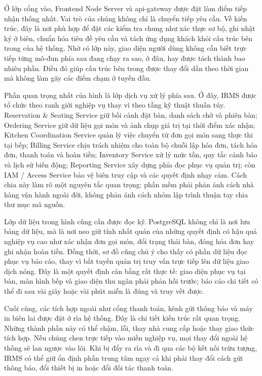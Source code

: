 \documentclass[11pt,a4paper]{article}
\begin{document}
Ở lớp cổng vào, \textsf{Frontend Node Server} và \textsf{api-gateway} được đặt làm điểm tiếp nhận thống nhất. Vai trò của chúng không chỉ là chuyển tiếp yêu cầu. Về kiến trúc, đây là nơi phù hợp để đặt các kiểm tra chung như xác thực sơ bộ, ghi nhật ký ở biên, chuẩn hóa tiêu đề yêu cầu và tách ứng dụng khách khỏi cấu trúc bên trong của hệ thống. Nhờ có lớp này, giao diện người dùng không cần biết trực tiếp từng mô-đun phía sau đang chạy ra sao, ở đâu, hay được tách thành bao nhiêu phần. Điều đó giúp cấu trúc bên trong được thay đổi dần theo thời gian mà không làm gãy các điểm chạm ở tuyến đầu.

Phần quan trọng nhất của hình là lớp dịch vụ xử lý phía sau. Ở đây, IRMS được tổ chức theo ranh giới nghiệp vụ thay vì theo tầng kỹ thuật thuần túy. \textsf{Reservation \& Seating Service} giữ bối cảnh đặt bàn, danh sách chờ và phiên bàn; \textsf{Ordering Service} giữ dữ liệu gọi món và ảnh chụp giá trị tại thời điểm xác nhận; \textsf{Kitchen Coordination Service} quản lý việc chuyển từ đơn gọi món sang thực thi tại bếp; \textsf{Billing Service} chịu trách nhiệm cho toàn bộ chuỗi lập hóa đơn, tách hóa đơn, thanh toán và hoàn tiền; \textsf{Inventory Service} xử lý mức tồn, quy tắc cảnh báo và lịch sử biến động; \textsf{Reporting Service} xây dựng phía đọc phục vụ quản trị; còn \textsf{IAM / Access Service} bảo vệ biên truy cập và các quyết định nhạy cảm. Cách chia này làm rõ một nguyên tắc quan trọng: phần mềm phải phản ánh cách nhà hàng vận hành ngoài đời, không phản ánh cách nhóm lập trình thuận tay chia thư mục mã nguồn.

Lớp dữ liệu trong hình cũng cần được đọc kỹ. \textsf{PostgreSQL} không chỉ là nơi lưu bảng dữ liệu, mà là nơi neo giữ tính nhất quán của những quyết định có hậu quả nghiệp vụ cao như xác nhận đơn gọi món, đổi trạng thái bàn, đóng hóa đơn hay ghi nhận hoàn tiền. Đồng thời, sơ đồ cũng chủ ý cho thấy có phần dữ liệu đọc phục vụ báo cáo, thay vì bắt tuyến quản trị truy vấn trực tiếp lên dữ liệu giao dịch nóng. Đây là một quyết định cân bằng rất thực tế: giao diện phục vụ tại bàn, màn hình bếp và giao diện thu ngân phải phản hồi trước; báo cáo chi tiết có thể đi sau vài giây hoặc vài phút miễn là đúng và truy vết được.

Cuối cùng, các tích hợp ngoài như cổng thanh toán, kênh gửi thông báo và máy in biên lai được đặt ở rìa hệ thống. Đây là chi tiết kiến trúc rất quan trọng. Những thành phần này có thể chậm, lỗi, thay nhà cung cấp hoặc thay giao thức tích hợp. Nếu chúng chen trực tiếp vào miền nghiệp vụ, mọi thay đổi ngoài hệ thống sẽ lan ngược vào lõi. Khi bị đẩy ra rìa và đi qua các bộ kết nối trừu tượng, IRMS có thể giữ ổn định phần trung tâm ngay cả khi phải thay đổi cách gửi thông báo, đổi thiết bị in hoặc đổi đối tác thanh toán.
\end{document}
